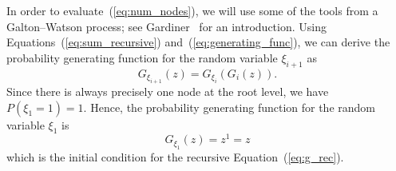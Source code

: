 \documentclass[algorithms,article,accept,pdftex,moreauthors]{Definitions/mdpi}
\begin{document}
%

In order to evaluate~(\ref{eq:num_nodes}), we will use some of the tools from 
a Galton--Watson process; see Gardiner~\cite{gardiner1985stochastic} for 
an introduction.
Using Equations~(\ref{eq:sum_recursive}) and~(\ref{eq:generating_func}), we can 
derive the probability generating function for the random variable $\xi_{i+1}$ as 
\begin{equation}\label{eq:g_rec}
G_{\xi_{i+1}}(z) = G_{\xi_i}(G_i(z)).
\end{equation}
Since there is always precisely one node at the root level, we have $P(\xi_1 = 1) = 1.$ 
Hence, the probability generating function for the random variable $\xi_1$ is 
\begin{equation}\label{eq:g_xi_one}
G_{\xi_1}(z) = z^1 = z
\end{equation}
which is the initial condition for the recursive Equation~(\ref{eq:g_rec}).
\end{document}

